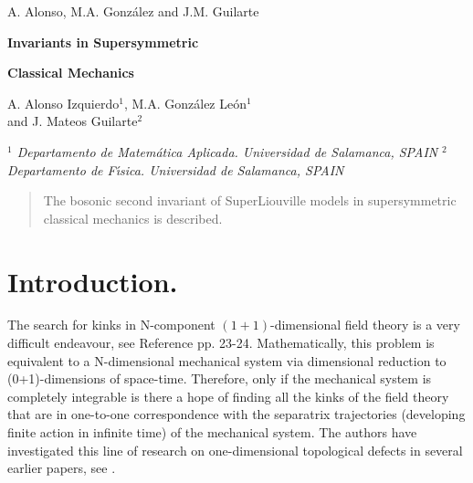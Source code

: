 \documentclass[a4paper,11pt,twoside]{article}
\begin{document}
\pagestyle{myheadings} 
{{\sc A. Alonso, M.A. Gonz\'alez and J.M. Guilarte }} \vspace{1cm}

%
%

\thispagestyle{empty}

\begin{center}

{\Large{\bf{Invariants in Supersymmetric}}}

\medskip

{\Large{\bf{Classical Mechanics}}}

\vskip1cm

{\sc A. Alonso Izquierdo$^1$, M.A.
Gonz\'alez Le\'on$^1$} \\
{\sc and J. Mateos Guilarte$^2$}
\vskip0.5cm

{\it $^1$ Departamento de Matem\'atica Aplicada. Universidad de Salamanca, SPAIN}
\vskip0.3cm
{\it $^2$ Departamento de
F\'{\i}sica. Universidad de Salamanca, SPAIN   }
\end{center}
\bigskip

%
%

\begin{abstract}
The bosonic second invariant of SuperLiouville models in
supersymmetric classical mechanics is described.
\end{abstract}

\section{Introduction.}

The search for kinks in N-component $(1+1)$-dimensional field
theory is a very difficult endeavour, see Reference \cite{Raja}
pp. 23-24. Mathematically, this problem is equivalent to a
N-dimensional mechanical system via dimensional reduction to
(0+1)-dimensions of space-time. Therefore, only if the mechanical
system is completely integrable is there a hope of finding all the
kinks of the field theory that are in one-to-one correspondence
with the separatrix trajectories (developing finite action in
infinite time) of the mechanical system. The authors have
investigated this line of research on one-dimensional topological
defects in several earlier papers, see \cite{Pa1}.
\end{document}
